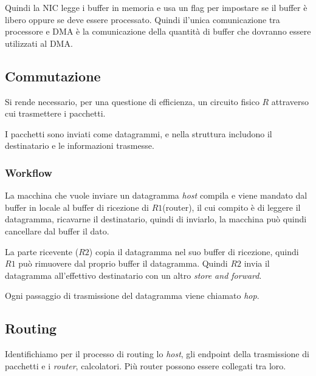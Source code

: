 Quindi la NIC legge i buffer in memoria e usa un flag per impostare se il buffer
è libero oppure se deve essere processato.
Quindi il'unica comunicazione tra processore e DMA è la comunicazione della 
quantità di buffer che dovranno essere utilizzati al DMA.

\subsection{Commutazione}
Si rende necessario, per una questione di efficienza, un circuito fisico $R$
attraverso cui trasmettere i pacchetti.

I pacchetti sono inviati come datagrammi, e nella struttura includono il
destinatario e le informazioni trasmesse.

\subsubsection{Workflow}
La macchina che vuole inviare un datagramma \emph{host} compila e viene mandato
dal buffer in locale al buffer di ricezione di $R1$(router), il cui compito è di
leggere il datagramma, ricavarne il destinatario, quindi di inviarlo, la
macchina può quindi cancellare dal buffer il dato.

La parte ricevente ($R2$) copia il datagramma nel suo buffer di ricezione,
quindi $R1$ può rimuovere dal proprio buffer il datagramma.
Quindi $R2$ invia il datagramma all'effettivo destinatario con un altro
\emph{store and forward}.

Ogni passaggio di trasmissione del datagramma viene chiamato \emph{hop}.

\subsection{Routing}
Identifichiamo per il processo di routing lo \emph{host}, gli endpoint della
trasmissione di pacchetti e i \emph{router}, calcolatori.
Più router possono essere collegati tra loro.
